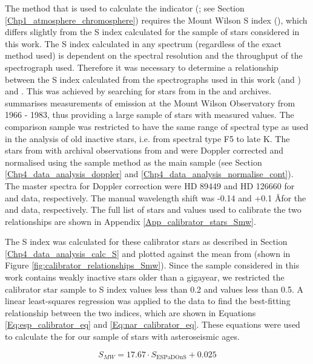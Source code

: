 The method that is used to calculate the \Rprime indicator (\citealt{Noyes_etal_1984}; see Section \ref{Chp1_atmosphere_chromosphere}) requires the Mount Wilson S index (\Smw), which differs slightly from the S index calculated for the sample of stars considered in this work. The S index calculated in any spectrum (regardless of the exact method used) is dependent on the spectral resolution and the throughput of the spectrograph used. Therefore it was necessary to determine a relationship between the S index calculated from the spectrographs used in this work (\esp and \narval) and \Smw. This was achieved by searching for stars from \citet{Duncan_etal_1991} in the \esp and \narval archives. \citet{Duncan_etal_1991} summarises measurements of \caII emission at the Mount Wilson Observatory from 1966 - 1983, thus providing a large sample of stars with measured \Smw values. The comparison sample was restricted to have the same range of spectral type as used in the analysis of old inactive stars, i.e. from spectral type F5 to late K. The stars from \citet{Duncan_etal_1991} with archival observations from \esp and \narval were Doppler corrected and normalised using the sample method as the main sample (see Section \ref{Chp4_data_analysis_doppler} and \ref{Chp4_data_analysis_normalise_cont}). The master spectra for Doppler correction were HD 89449 and HD 126660 for \esp and \narval data, respectively. The manual wavelength shift was -0.14 and +0.1 \AA \space for the \esp and \narval data, respectively. The full list of stars and values used to calibrate the two relationships are shown in Appendix \ref{App_calibrator_stars_Smw}.

The S index was calculated for these calibrator stars as described in Section \ref{Chp4_data_analysis_calc_S} and plotted against the mean \Smw from \citet{Duncan_etal_1991} (shown in Figure \ref{fig:calibrator_relationships_Smw}). Since the sample considered in this work contains weakly inactive stars older than a gigayear, we restricted the calibrator star sample to S index values less than 0.2 and \Smw values less than 0.5. A linear least-squares regression was applied to the data to find the best-fitting relationship between the two indices, which are shown in Equations \ref{Eq:esp_calibrator_eq} and \ref{Eq:nar_calibrator_eq}. These equations were used to calculate the \Smw for our sample of stars with asteroseismic ages.

\begin{equation}
S_{MW} = 17.67 \cdot S_{\mathrm{ESPaDOnS}}+ 0.025
\label{Eq:esp_calibrator_eq}
\end{equation}

